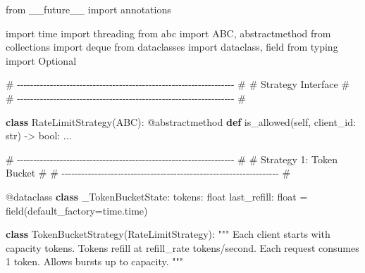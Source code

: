 \documentclass[11pt]{article}
\newenvironment{Shaded}{\begin{snugshade}}{\end{snugshade}}
\newcommand{\AttributeTok}[1]{\textcolor[rgb]{0.16,0.50,0.73}{#1}}
\newcommand{\BuiltInTok}[1]{\textcolor[rgb]{0.50,0.55,0.55}{#1}}
\newcommand{\CommentTok}[1]{\textcolor[rgb]{0.48,0.49,0.49}{#1}}
\newcommand{\ImportTok}[1]{\textcolor[rgb]{0.15,0.68,0.38}{#1}}
\newcommand{\KeywordTok}[1]{\textcolor[rgb]{0.81,0.81,0.76}{\textbf{#1}}}
\newcommand{\NormalTok}[1]{\textcolor[rgb]{0.81,0.81,0.76}{#1}}
\newcommand{\OperatorTok}[1]{\textcolor[rgb]{0.81,0.81,0.76}{#1}}
\newcommand{\VariableTok}[1]{\textcolor[rgb]{0.15,0.68,0.68}{#1}}
\begin{document}

\begin{Shaded}
\begin{Highlighting}[]
\ImportTok{from}\NormalTok{ \_\_future\_\_ }\ImportTok{import}\NormalTok{ annotations}

\ImportTok{import}\NormalTok{ time}
\ImportTok{import}\NormalTok{ threading}
\ImportTok{from}\NormalTok{ abc }\ImportTok{import}\NormalTok{ ABC, abstractmethod}
\ImportTok{from}\NormalTok{ collections }\ImportTok{import}\NormalTok{ deque}
\ImportTok{from}\NormalTok{ dataclasses }\ImportTok{import}\NormalTok{ dataclass, field}
\ImportTok{from}\NormalTok{ typing }\ImportTok{import}\NormalTok{ Optional}


\CommentTok{\# {-}{-}{-}{-}{-}{-}{-}{-}{-}{-}{-}{-}{-}{-}{-}{-}{-}{-}{-}{-}{-}{-}{-}{-}{-}{-}{-}{-}{-}{-}{-}{-}{-}{-}{-}{-}{-}{-}{-}{-}{-}{-}{-}{-}{-}{-}{-}{-}{-}{-}{-}{-}{-}{-}{-}{-}{-}{-}{-}{-}{-}{-}{-}{-}{-}{-} \#}
\CommentTok{\# Strategy Interface                                                  \#}
\CommentTok{\# {-}{-}{-}{-}{-}{-}{-}{-}{-}{-}{-}{-}{-}{-}{-}{-}{-}{-}{-}{-}{-}{-}{-}{-}{-}{-}{-}{-}{-}{-}{-}{-}{-}{-}{-}{-}{-}{-}{-}{-}{-}{-}{-}{-}{-}{-}{-}{-}{-}{-}{-}{-}{-}{-}{-}{-}{-}{-}{-}{-}{-}{-}{-}{-}{-}{-} \#}

\KeywordTok{class}\NormalTok{ RateLimitStrategy(ABC):}
    \AttributeTok{@abstractmethod}
    \KeywordTok{def}\NormalTok{ is\_allowed(}\VariableTok{self}\NormalTok{, client\_id: }\BuiltInTok{str}\NormalTok{) }\OperatorTok{{-}\textgreater{}} \BuiltInTok{bool}\NormalTok{:}
\NormalTok{        ...}


\CommentTok{\# {-}{-}{-}{-}{-}{-}{-}{-}{-}{-}{-}{-}{-}{-}{-}{-}{-}{-}{-}{-}{-}{-}{-}{-}{-}{-}{-}{-}{-}{-}{-}{-}{-}{-}{-}{-}{-}{-}{-}{-}{-}{-}{-}{-}{-}{-}{-}{-}{-}{-}{-}{-}{-}{-}{-}{-}{-}{-}{-}{-}{-}{-}{-}{-}{-}{-} \#}
\CommentTok{\# Strategy 1: Token Bucket                                            \#}
\CommentTok{\# {-}{-}{-}{-}{-}{-}{-}{-}{-}{-}{-}{-}{-}{-}{-}{-}{-}{-}{-}{-}{-}{-}{-}{-}{-}{-}{-}{-}{-}{-}{-}{-}{-}{-}{-}{-}{-}{-}{-}{-}{-}{-}{-}{-}{-}{-}{-}{-}{-}{-}{-}{-}{-}{-}{-}{-}{-}{-}{-}{-}{-}{-}{-}{-}{-}{-} \#}

\AttributeTok{@dataclass}
\KeywordTok{class}\NormalTok{ \_TokenBucketState:}
\NormalTok{    tokens: }\BuiltInTok{float}
\NormalTok{    last\_refill: }\BuiltInTok{float} \OperatorTok{=}\NormalTok{ field(default\_factory}\OperatorTok{=}\NormalTok{time.time)}


\KeywordTok{class}\NormalTok{ TokenBucketStrategy(RateLimitStrategy):}
    \CommentTok{"""}
\CommentTok{    Each client starts with \textasciigrave{}capacity\textasciigrave{} tokens.}
\CommentTok{    Tokens refill at \textasciigrave{}refill\_rate\textasciigrave{} tokens/second.}
\CommentTok{    Each request consumes 1 token. Allows bursts up to \textasciigrave{}capacity\textasciigrave{}.}
\CommentTok{    """}


\end{Highlighting}
\end{Shaded}
\end{document}
